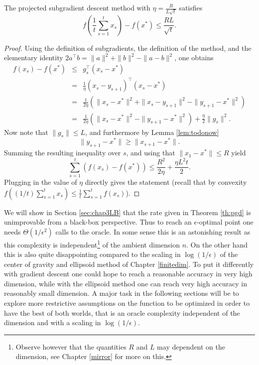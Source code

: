 \begin{theorem} \label{th:pgd}
The projected subgradient descent method with $\eta = \frac{R}{L \sqrt{t}}$ satisfies 
$$f\left(\frac{1}{t} \sum_{s=1}^t x_s\right) - f(x^*) \leq \frac{R L}{\sqrt{t}} .$$
\end{theorem}


\begin{proof}
Using the definition of subgradients, the definition of the method, and the elementary identity $2 a^{\top} b = \|a\|^2 + \|b\|^2 - \|a-b\|^2$, one obtains
\begin{eqnarray*}
f(x_s) - f(x^*) & \leq & g_s^{\top} (x_s - x^*) \\
& = & \frac{1}{\eta} (x_s - y_{s+1})^{\top} (x_s - x^*) \\
& = & \frac{1}{2 \eta} \left(\|x_s - x^*\|^2 + \|x_s - y_{s+1}\|^2 - \|y_{s+1} - x^*\|^2\right) \\
& = & \frac{1}{2 \eta} \left(\|x_s - x^*\|^2 - \|y_{s+1} - x^*\|^2\right) + \frac{\eta}{2} \|g_s\|^2.
\end{eqnarray*}
Now note that $\|g_s\| \leq L$, and furthermore by Lemma \ref{lem:todonow}
$$\|y_{s+1} - x^*\| \geq \|x_{s+1} - x^*\| .$$
Summing the resulting inequality over $s$, and using that $\|x_1 - x^*\| \leq R$ yield
$$\sum_{s=1}^t \left( f(x_s) - f(x^*) \right) \leq \frac{R^2}{2 \eta} + \frac{\eta L^2 t}{2} .$$
Plugging in the value of $\eta$ directly gives the statement (recall that by convexity $f((1/t) \sum_{s=1}^t x_s) \leq \frac1{t} \sum_{s=1}^t f(x_s)$).
\end{proof}

We will show in Section \ref{sec:chap3LB} that the rate given in Theorem \ref{th:pgd} is unimprovable from a black-box perspective. Thus to reach an $\epsilon$-optimal point one needs $\Theta(1/\epsilon^2)$ calls to the oracle. In some sense this is an astonishing result as this complexity is independent\footnote{Observe however that the quantities $R$ and $L$ may dependent on the dimension, see Chapter \ref{mirror} for more on this.} of the ambient dimension $n$. On the other hand this is also quite disappointing compared to the scaling in $\log(1/\epsilon)$ of the center of gravity and ellipsoid method of Chapter \ref{finitedim}. To put it differently with gradient descent one could hope to reach a reasonable accuracy in very high dimension, while with the ellipsoid method one can reach very high accuracy in reasonably small dimension. A major task in the following sections will be to explore more restrictive assumptions on the function to be optimized in order to have the best of both worlds, that is an oracle complexity independent of the dimension and with a scaling in $\log(1/\epsilon)$.

